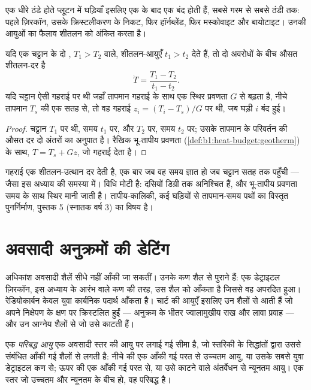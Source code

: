 एक धीरे ठंडे होते प्लूटन में घड़ियाँ इसलिए एक के बाद एक बंद होती हैं, सबसे गरम से सबसे ठंडी तक: पहले ज़िरकॉन, उसके क्रिस्टलीकरण के निकट, फिर हॉर्नब्लेंड, फिर मस्कोवाइट और बायोटाइट। उनकी आयुओं का फैलाव शीतलन को अंकित करता है।

\begin{proposition}\label{prop:b1:radiometric-methods:cooling}
यदि एक चट्टान के दो ,  $T_1 > T_2$ वाले, शीतलन-आयुएँ $t_1 > t_2$ देते हैं, तो दो अवरोधों के बीच औसत शीतलन-दर है
\[
  \dot T = \frac{T_1 - T_2}{t_1 - t_2}.
\]
यदि चट्टान ऐसी गहराई पर थी जहाँ तापमान गहराई के साथ एक स्थिर प्रवणता $G$ से बढ़ता है, नीचे तापमान $T_s$ की एक सतह से, तो वह गहराई $z_i
= (T_i - T_s)/G$ पर थी, जब घड़ी $i$ बंद हुई।
\end{proposition}

\begin{proof}
चट्टान $T_1$ पर थी, समय $t_1$ पर, और $T_2$ पर, समय $t_2$ पर; उसके तापमान के परिवर्तन की औसत दर दो अंतरों का अनुपात है। रैखिक भू-तापीय प्रवणता (\cref{def:b1:heat-budget:geotherm}) के साथ, $T = T_s + G z$, जो गहराई देता है।
\end{proof}

गहराई एक शीतलन-उत्थान दर देती है, एक बार जब वह समय ज्ञात हो जब चट्टान सतह तक पहुँची --- जैसा इस अध्याय की समस्या में। विधि मोटी है:  दसियों डिग्री तक अनिश्चित हैं, और भू-तापीय प्रवणता समय के साथ स्थिर मानी जाती है। तापीय-कालिकी, कई घड़ियों से तापमान-समय पथों का विस्तृत पुनर्निर्माण, पुस्तक 5 (स्नातक वर्ष 3) का विषय है।

\section{अवसादी अनुक्रमों की डेटिंग}\label{sec:b1:radiometric-methods:sediments}

अधिकांश अवसादी शैलें सीधे नहीं आँकी जा सकतीं। उनके कण शैल से पुराने हैं: एक डेट्राइटल ज़िरकॉन, इस अध्याय के आरंभ वाले कण की तरह, उस शैल को आँकता है जिससे वह अपरदित हुआ। रेडियोकार्बन केवल युवा कार्बनिक पदार्थ आँकता है। चार्ट की आयुएँ इसलिए उन शैलों से आती हैं जो अपने निक्षेपण के क्षण पर क्रिस्टलित हुईं --- अनुक्रम के भीतर ज्वालामुखीय राख और लावा प्रवाह --- और उन आग्नेय शैलों से जो उसे काटती हैं।

\begin{definition}[परिबद्ध आयु]\label{def:b1:radiometric-methods:bracketing}
एक \emph{परिबद्ध आयु} एक अवसादी स्तर की आयु पर लगाई गई सीमा है, जो स्तरिकी के सिद्धांतों द्वारा उससे संबंधित आँकी गई शैलों से लगती है: नीचे की एक आँकी गई परत से उच्चतम आयु, या उसके सबसे युवा डेट्राइटल कण से; ऊपर की एक आँकी गई परत से, या उसे काटने वाले अंतर्वेधन से न्यूनतम आयु। एक स्तर जो उच्चतम और न्यूनतम के बीच हो, वह परिबद्ध है।
\end{definition}

